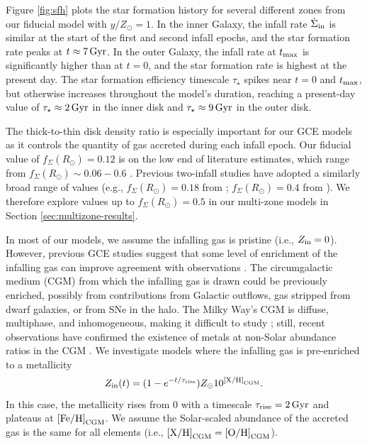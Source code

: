 \documentclass[twocolumn,twocolappendix,linenumbers]{aastex631}
\newcommand{\mathXH}{{\rm [X/H]}}
\newcommand{\mathOH}{{\rm [O/H]}}
\newcommand{\mathFeH}{{\rm [Fe/H]}}
\begin{document}
Figure \ref{fig:sfh} plots the star formation history for several different zones from our fiducial model with $y/Z_\odot=1$. In the inner Galaxy, the infall rate $\dot\Sigma_{\rm in}$ is similar at the start of the first and second infall epochs, and the star formation rate peaks at $t\approx7\,{\rm Gyr}$. In the outer Galaxy, the infall rate at $t_{\rm max}$ is significantly higher than at $t=0$, and the star formation rate is highest at the present day. The star formation efficiency timescale $\tau_\star$ spikes near $t=0$ and $t_{\rm max}$, but otherwise increases throughout the model's duration, reaching a present-day value of $\tau_\star\approx2\,{\rm Gyr}$ in the inner disk and $\tau_\star\approx 9\,{\rm Gyr}$ in the outer disk.

The thick-to-thin disk density ratio is especially important for our GCE models as it controls the quantity of gas accreted during each infall epoch. Our fiducial value of $f_\Sigma(R_\odot)=0.12$ is on the low end of literature estimates, which range from $f_\Sigma(R_\odot)\sim0.06-0.6$ \citep[e.g.,][]{gilmore_new_1983,siegel_star_2002,juric_milky_2008,mackereth_age-metallicity_2017,fuhrmann_local_2017}. Previous two-infall studies have adopted a similarly broad range of values (e.g., $f_\Sigma(R_\odot)=0.18$ from \citealt{spitoni_apogee_2021}; $f_\Sigma(R_\odot)=0.4$ from \citealt{spitoni_remind_2024}). We therefore explore values up to $f_\Sigma(R_\odot)=0.5$ in our multi-zone models in Section \ref{sec:multizone-results}.

In most of our models, we assume the infalling gas is pristine (i.e., $Z_{\rm in}=0$). However, previous GCE studies suggest that some level of enrichment of the infalling gas can improve agreement with observations \citep[e.g.,][]{palla_chemical_2020,johnson_milky_2024,spitoni_remind_2024}. The circumgalactic medium (CGM) from which the infalling gas is drawn could be previously enriched, possibly from contributions from Galactic outflows, gas stripped from dwarf galaxies, or from SNe in the halo. The Milky Way's CGM is diffuse, multiphase, and inhomogeneous, making it difficult to study \citep[e.g.,][]{tumlinson_circumgalactic_2017,mathur_probing_2022}; still, recent observations have confirmed the existence of metals at non-Solar abundance ratios in the CGM \citep[e.g.,][]{das_discovery_2019,das_hot_2021,gupta_supervirial_2021}. We investigate models where the infalling gas is pre-enriched to a metallicity
\begin{equation}
    \label{eq:pre-enrichment}
    Z_{\rm in}(t) = (1 - e^{-t/\tau_{\rm rise}}) Z_\odot 10^{\mathXH_{\rm CGM}}.
\end{equation}
In this case, the metallicity rises from 0 with a timescale $\tau_{\rm rise}=2\,{\rm Gyr}$ and plateaus at $\mathFeH_{\rm CGM}$. We assume the Solar-scaled abundance of the accreted gas is the same for all elements (i.e., $\mathXH_{\rm CGM}=\mathOH_{\rm CGM}$).
\end{document}
